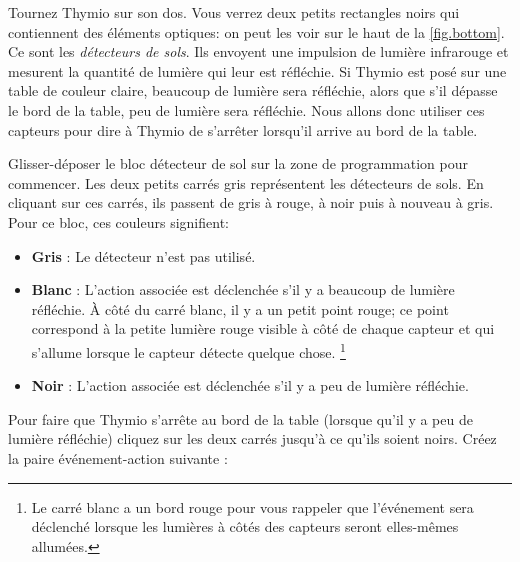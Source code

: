 
Tournez Thymio sur son dos.
Vous verrez deux petits rectangles noirs qui contiennent des éléments optiques: on peut les voir sur le haut de la \cref{fig.bottom}.
Ce sont les \emph{détecteurs de sols}.
Ils envoyent une impulsion de lumière infrarouge et mesurent la quantité de lumière qui leur est réfléchie.
Si Thymio est posé sur une table de couleur claire, beaucoup de lumière sera réfléchie, alors que s'il dépasse le bord de la table, peu de lumière sera réfléchie.
Nous allons donc utiliser ces capteurs pour dire à Thymio de s'arrêter lorsqu'il arrive au bord de la table.


Glisser-déposer le bloc détecteur de sol  sur la zone de programmation pour commencer.
Les deux petits carrés gris représentent les détecteurs de sols.
En cliquant sur ces carrés, ils passent de gris à rouge, à noir puis à nouveau à gris.
Pour ce bloc, ces couleurs signifient:

\begin{itemize}

\item \textbf{Gris} : Le détecteur n'est pas utilisé.

\item \textbf{Blanc} : L'action associée est déclenchée s'il y a beaucoup de lumière réfléchie.\label{p.proximity-colors1}
À côté du carré blanc, il y a un petit point rouge;
ce point correspond à la petite lumière rouge visible à côté de chaque capteur et qui s'allume lorsque le capteur détecte quelque chose.
\footnote{Le carré blanc a un bord rouge pour vous rappeler que l'événement sera déclenché lorsque les lumières à côtés des capteurs seront elles-mêmes allumées.}
\item \textbf{Noir} : L'action associée est déclenchée s'il y a peu de lumière réfléchie.
\end{itemize}

Pour faire que Thymio s'arrête au bord de la table (lorsque qu'il y a peu de lumière réfléchie) cliquez sur les deux carrés jusqu'à ce qu'ils soient noirs.
Créez la paire événement-action suivante : 

